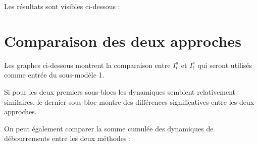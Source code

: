 \documentclass[a4paper, 11pt]{article}
\begin{document}
Les résultats sont visibles ci-dessous :

\begin{figure}[!h]
 \centering
\end{figure}
 
\begin{figure}[!h]
 \centering
\end{figure}

\begin{figure}[!h]
 \centering
\end{figure}

\clearpage


\section{Comparaison des deux approches}

Les graphes ci-dessous montrent la comparaison entre $I_t^a$ et $I_t^s$ qui seront utilisés comme entrée du sous-modèle 1.

\begin{figure}[h]
 \centering
\end{figure}
 
\begin{figure}[h]
 \centering
\end{figure}

\begin{figure}[ht]
 \centering
\end{figure}

\newpage

Si pour les deux premiers sous-blocs les dynamiques semblent relativement similaires, le dernier sous-bloc montre des différences significatives entre les deux approches.

On peut également comparer la somme cumulée des dynamiques de débourrements entre les deux méthodes :

\begin{figure}[h]
 \centering
\end{figure}
 
\begin{figure}[h]
 \centering
\end{figure}

\begin{figure}[ht]
 \centering
\end{figure}
\end{document}
